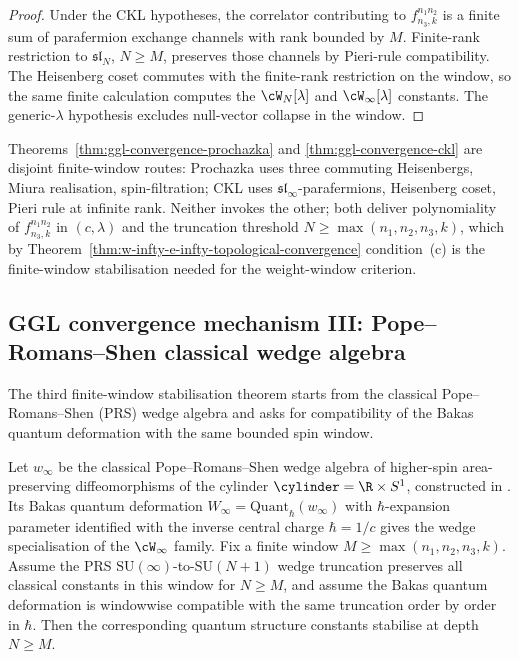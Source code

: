 \begin{proof}
Under the CKL hypotheses, the correlator contributing to
\(f^{n_1 n_2}_{n_3,k}\) is a finite sum of parafermion exchange
channels with rank bounded by \(M\). Finite-rank restriction to
\(\mathfrak{sl}_N\), \(N\ge M\), preserves those channels by
Pieri-rule compatibility. The Heisenberg coset commutes with the
finite-rank restriction on the window, so the same finite
calculation computes the \(\cW_N[\lambda]\) and
\(\cW_\infty[\lambda]\) constants. The generic-\(\lambda\)
hypothesis excludes null-vector collapse in the window.
\end{proof}

\begin{remark}
\label{rem:ckl-vs-prochazka-disjoint}
Theorems~\ref{thm:ggl-convergence-prochazka} and
\ref{thm:ggl-convergence-ckl} are disjoint finite-window routes:
Prochazka uses three commuting Heisenbergs, Miura realisation,
spin-filtration; CKL uses $\mathfrak{sl}_\infty$-parafermions,
Heisenberg coset, Pieri rule at infinite rank. Neither invokes
the other; both deliver polynomiality of $f^{n_1 n_2}_{n_3,k}$
in $(c, \lambda)$ and the truncation threshold
$N \ge \max(n_1, n_2, n_3, k)$, which by
Theorem~\ref{thm:w-infty-e-infty-topological-convergence}
condition~\textup{(c)} is the finite-window stabilisation needed
for the weight-window criterion.
\end{remark}

\subsection{GGL convergence mechanism III: Pope--Romans--Shen
classical wedge algebra}
\label{subsec:ggl-mechanism-iii-prs}

The third finite-window stabilisation theorem starts from the
classical Pope--Romans--Shen (PRS) wedge algebra and asks for
compatibility of the Bakas quantum deformation with the same
bounded spin window.

\begin{theorem}
\label{thm:ggl-convergence-prs-bakas}
Let $w_\infty$ be the classical Pope--Romans--Shen wedge algebra of
higher-spin area-preserving diffeomorphisms of the cylinder
$\cylinder = \R \times S^1$, constructed in
\cite{PopeRomansShen-winfty-wedge}. Its Bakas quantum deformation
$W_\infty = \mathrm{Quant}_\hbar(w_\infty)$
\cite{Bakas-Winfty,BergshoeffPopeShen-Winfty-quantum} with
$\hbar$-expansion parameter identified with the inverse central charge
$\hbar = 1/c$ gives the wedge specialisation of the
$\cW_\infty$ family. Fix a finite window
\(M\ge\max(n_1,n_2,n_3,k)\). Assume the PRS
\(\mathrm{SU}(\infty)\)-to-\(\mathrm{SU}(N+1)\) wedge truncation
preserves all classical constants in this window for \(N\ge M\), and
assume the Bakas quantum deformation is windowwise compatible with the
same truncation order by order in \(\hbar\). Then the corresponding
quantum structure constants stabilise at depth \(N\ge M\).
\end{theorem}

